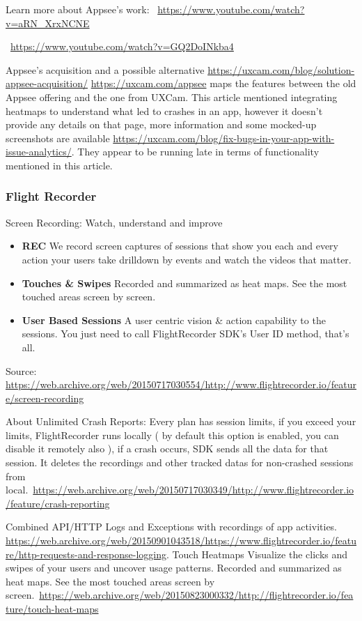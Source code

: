 Learn more about Appsee's work: ~\url{https://www.youtube.com/watch?v=aRN_XrxNCNE}

~\url{https://www.youtube.com/watch?v=GQ2DoINkba4}

Appsee's acquisition and a possible alternative \url{https://uxcam.com/blog/solution-appsee-acquisition/} \url{https://uxcam.com/appsee} maps the features between the old Appsee offering and the one from UXCam. This article mentioned integrating heatmaps to understand what led to crashes in an app, however it doesn't provide any details on that page, more information and some mocked-up screenshots are available \url{https://uxcam.com/blog/fix-bugs-in-your-app-with-issue-analytics/}. They appear to be running late in terms of functionality mentioned in this article. 



\subsubsection{Flight Recorder}
Screen Recording: 
Watch, understand and improve
\begin{itemize}
    \item \textbf{REC} We record screen captures of sessions that show you each and every action your users take drilldown by events and watch the videos that matter.
    \item \textbf{Touches \& Swipes} Recorded and summarized as heat maps. See the most touched areas screen by screen.
    \item \textbf{User Based Sessions} A user centric vision \& action capability to the sessions. You just need to call FlightRecorder SDK's User ID method, that's all.
\end{itemize}
Source: \url{https://web.archive.org/web/20150717030554/http://www.flightrecorder.io/feature/screen-recording}

About Unlimited Crash Reports: 
Every plan has session limits, if you exceed your limits, FlightRecorder runs locally ( by default this option is enabled, you can disable it remotely also ), if a crash occurs, SDK sends all the data for that session. It deletes the recordings and other tracked datas for non-crashed sessions from local.~\url{https://web.archive.org/web/20150717030349/http://www.flightrecorder.io/feature/crash-reporting}

Combined API/HTTP Logs and Exceptions with recordings of app activities. \url{https://web.archive.org/web/20150901043518/https://www.flightrecorder.io/feature/http-requests-and-response-logging}. Touch Heatmaps
Visualize the clicks and swipes of your users and uncover usage patterns. Recorded and summarized as heat maps. See the most touched areas screen by screen.~\url{https://web.archive.org/web/20150823000332/http://flightrecorder.io/feature/touch-heat-maps}

